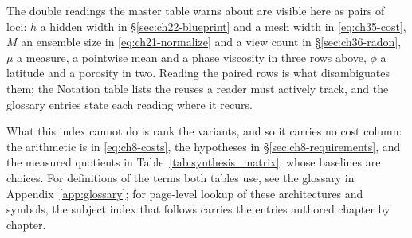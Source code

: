 The double readings the master table warns about are visible here as pairs of loci: $h$ a
hidden width in \S\ref{sec:ch22-blueprint} and a mesh width in \eqref{eq:ch35-cost}, $M$ an
ensemble size in \eqref{eq:ch21-normalize} and a view count in \S\ref{sec:ch36-radon}, $\mu$
a measure, a pointwise mean and a phase viscosity in three rows above, $\phi$ a latitude and
a porosity in two. Reading the paired rows is what disambiguates them; the Notation
table lists the reuses a reader must actively track, and the glossary entries state
each reading where it recurs.

What this index cannot do is rank the variants, and so it carries no cost column: the
arithmetic is in \eqref{eq:ch8-costs}, the hypotheses in \S\ref{sec:ch8-requirements}, and
the measured quotients in Table~\ref{tab:synthesis_matrix}, whose baselines are choices. For definitions of the terms both tables use, see the
glossary in Appendix~\ref{app:glossary}; for page-level lookup of these architectures and
symbols, the subject index that follows carries the entries authored chapter by chapter.
